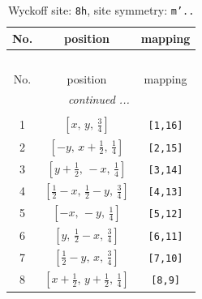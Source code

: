 \documentclass[fleqn,8pt]{jsarticle}
\begin{document}
\begin{longtable}{ccc}
\caption{Wyckoff site: {\tt 8h}, site symmetry: {\tt m'..}}
 \\
 \hline \hline
No. & position & mapping \\ \hline \endfirsthead

\multicolumn{2}{l}{\tablename\ \thetable{}} \\
 \hline \hline
No. & position & mapping \\ \hline \endhead

 \hline \hline
\multicolumn{2}{r}{\footnotesize\it continued ...} \\ \endfoot

 \hline \hline
\multicolumn{2}{r}{} \\ \endlastfoot

1 & $\left[ x,\, y,\, \frac{3}{4} \right]$ & {\tt [1,16]} \\ \hline
2 & $\left[ - y,\, x + \frac{1}{2},\, \frac{1}{4} \right]$ & {\tt [2,15]} \\ \hline
3 & $\left[ y + \frac{1}{2},\, - x,\, \frac{1}{4} \right]$ & {\tt [3,14]} \\ \hline
4 & $\left[ \frac{1}{2} - x,\, \frac{1}{2} - y,\, \frac{3}{4} \right]$ & {\tt [4,13]} \\ \hline
5 & $\left[ - x,\, - y,\, \frac{1}{4} \right]$ & {\tt [5,12]} \\ \hline
6 & $\left[ y,\, \frac{1}{2} - x,\, \frac{3}{4} \right]$ & {\tt [6,11]} \\ \hline
7 & $\left[ \frac{1}{2} - y,\, x,\, \frac{3}{4} \right]$ & {\tt [7,10]} \\ \hline
8 & $\left[ x + \frac{1}{2},\, y + \frac{1}{2},\, \frac{1}{4} \right]$ & {\tt [8,9]} \\
\end{longtable}
\renewcommand{\arraystretch}{1.2}
\end{document}
